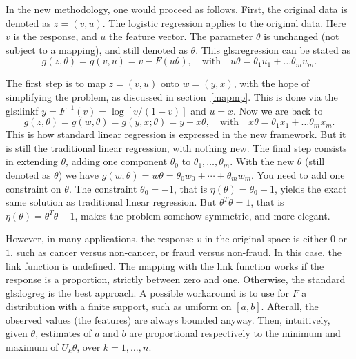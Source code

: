\documentclass[oneside,10pt]{book}
\begin{document}
In the new methodology, one would proceed as follows. First, the original data is denoted as $z=(v,u)$. The logistic regression applies to the original data. Here $v$ is the response,
 and $u$ the feature vector. The parameter $\theta$ is unchanged (not subject to a mapping), and still denoted as $\theta$.  This \gls{gls:regression} can be stated as
$$
g(z,\theta)=g(v,u)= v-F(u\theta), \quad \text{with } \text{ } u\theta=\theta_1 u_1 + \dots \theta_m u_m.
$$

The first step is to map $z=(v,u)$ onto $w=(y,x)$, with the hope of simplifying the problem, as discussed in section~\ref{mapmp}. This is done
 via the \gls{gls:linkf} $y=F^{-1}(v)=\log[v/(1-v)]$ and $u=x$. Now we are back to
$$
g(z,\theta)=g(w,\theta)=g(y,x;\theta)= y-x\theta, \quad \text{with } \text{ } x\theta=\theta_1 x_1 + \dots \theta_m x_m.
$$
This is how standard linear regression is expressed in the new framework. But it is still the traditional linear regression, with nothing new. The final step
 consists in extending $\theta$, adding one component $\theta_0$ to $\theta_1,\dots,\theta_m$. With the new $\theta$ (still denoted as $\theta$) we have $g(w,\theta)=w\theta=\theta_0 w_0+\cdots + \theta_m w_m$. You need to add one constraint on $\theta$. The constraint $\theta_0=-1$,
 that is $\eta(\theta)=\theta_0+1$, yields the exact same solution as traditional linear regression. But $\theta^T\theta=1$, that is $\eta(\theta)=\theta^T\theta-1$, makes the problem somehow symmetric, and more elegant.

However, in many applications, the response $v$ in the original space is either $0$ or $1$, such as cancer versus non-cancer, or fraud versus non-fraud.  In this case, the link function is undefined. The mapping with the link function works if the response is a proportion, strictly between zero and one. Otherwise, the standard \gls{gls:logreg} is the best approach.
 A possible workaround is to use for $F$ a distribution with a finite support, such as uniform on $[a,b]$. Afterall, the observed values (the features) are always bounded anyway. Then, intuitively, given $\theta$, estimates of $a$ and $b$ are proportional respectively to the minimum and maximum of $U_k\theta$, over $k=1,\dots,n$.
\end{document}
